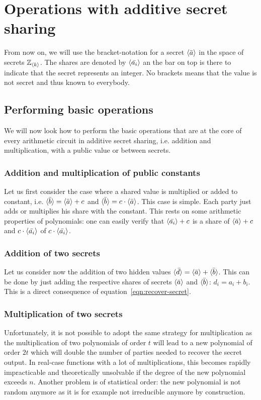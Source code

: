 \section{Operations with additive secret sharing}
From now on, we will use the bracket-notation for a secret $\langle \bar{a} \rangle$ in the space of secrets $\mathbb{Z}_{\langle k \rangle}$. The shares are denoted by $\langle \bar{a_i} \rangle$ an the bar on top is there to indicate that the secret represents an integer. No brackets means that the value is not secret and thus known to everybody.

\subsection{Performing basic operations}
We will now look how to perform the basic operations that are at the core of every arithmetic circuit in additive secret sharing, i.e. addition and multiplication, with a public value or between secrets.

\subsubsection{Addition and multiplication of public constants}
Let us first consider the case where a shared value is multiplied or added to constant, i.e. $\langle \bar{b} \rangle = \langle \bar{a} \rangle + c$ and $\langle \bar{b} \rangle = c \cdot \langle \bar{a} \rangle$. This case is simple. Each party just adds or multiplies his share with the constant. This rests on some arithmetic properties of polynomials: one can easily verify that $\langle \bar{a_i} \rangle+c$ is a share of $\langle \bar{a} \rangle+c$ and $c \cdot \langle \bar{a_i} \rangle$ of $c \cdot \langle \bar{a_i} \rangle$.

\subsubsection{Addition of two secrets}
Let us consider now the addition of two hidden values $\langle \bar{d} \rangle = \langle \bar{a} \rangle + \langle \bar{b} \rangle$. This can be done by just adding the respective shares of secrets $\langle \bar{a} \rangle$ and $\langle \bar{b} \rangle$: $d_i = a_i+b_i$. This is a direct consequence of equation~\ref{eqn:recover-secret}.


\subsubsection{Multiplication of two secrets}
Unfortunately, it is not possible to adopt the same strategy for multiplication as the multiplication of two polynomials of order $t$ will lead to a new polynomial of order $2t$ which will double the number of parties needed to recover the secret output. In real-case functions with a lot of multiplications, this becomes rapidly impracticable and theoretically unsolvable if the degree of the new polynomial exceeds $n$. Another problem is of statistical order: the new polynomial is not random anymore as it is for example not irreducible anymore by construction.

